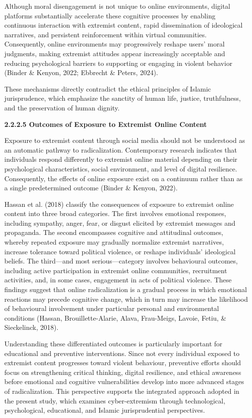\documentclass[11pt,a4paper]{article}
\begin{document}
	Although moral disengagement is not unique to online environments, digital platforms substantially accelerate these cognitive processes by enabling continuous interaction with extremist content, rapid dissemination of ideological narratives, and persistent reinforcement within virtual communities. Consequently, online environments may progressively reshape users' moral judgments, making extremist attitudes appear increasingly acceptable and reducing psychological barriers to supporting or engaging in violent behavior (Binder \& Kenyon, 2022; Ebbrecht \& Peters, 2024).
	
	These mechanisms directly contradict the ethical principles of Islamic jurisprudence, which emphasize the sanctity of human life, justice, truthfulness, and the preservation of human dignity.
	
	\textbf{2.2.2.5 Outcomes of Exposure to Extremist Online Content}
	
	Exposure to extremist content through social media should not be understood as an automatic pathway to radicalization. Contemporary research indicates that individuals respond differently to extremist online material depending on their psychological characteristics, social environment, and level of digital resilience. Consequently, the effects of online exposure exist on a continuum rather than as a single predetermined outcome (Binder \& Kenyon, 2022).
	
	Hassan et al. (2018) classify the consequences of exposure to extremist online content into three broad categories. The first involves emotional responses, including sympathy, anger, fear, or disgust elicited by extremist messages and propaganda. The second encompasses cognitive and attitudinal outcomes, whereby repeated exposure may gradually normalize extremist narratives, increase tolerance toward political violence, or reshape individuals' ideological beliefs. The third---and most serious---category involves behavioural outcomes, including active participation in extremist online communities, recruitment activities, and, in some cases, engagement in acts of political violence. These findings suggest that online radicalization is a gradual process in which emotional reactions may precede cognitive change, which in turn may increase the likelihood of behavioural involvement under particular personal and environmental conditions (Hassan, Brouillette-Alarie, Alava, Frau-Meigs, Lavoie, Fetiu, \& Sieckelinck, 2018).
	
	Understanding these differentiated outcomes is particularly important for educational and preventive interventions. Since not every individual exposed to extremist content progresses toward violent behaviour, preventive efforts should focus on strengthening critical thinking, digital resilience, and ethical awareness before emotional and cognitive vulnerabilities develop into more advanced stages of radicalization. This perspective supports the integrated approach adopted in the present study, which examines cyber-extremism through technological, psychological, educational, and Islamic jurisprudential perspectives.
	
\end{document}
